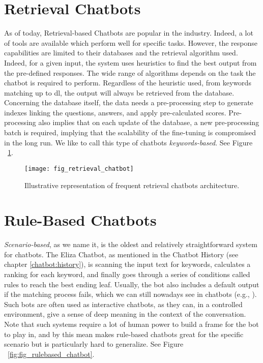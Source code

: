 
\section{Retrieval Chatbots}
\label{chatbot:retrieval}
As of today, Retrieval-based Chatbots are popular in the industry. Indeed, a lot of tools are available which perform well for specific tasks. However, the response capabilities are limited to their databases and the retrieval algorithm used. Indeed, for a given input, the system uses heuristics to find the best output from the pre-defined responses. The wide range of algorithms depends on the task the chatbot is required to perform. Regardless of the heuristic used, from keywords matching up to \gls{dl}, the output will always be retrieved from the database. Concerning the database itself, the data needs a pre-processing step to generate indexes linking the questions, answers, and apply pre-calculated scores. Pre-processing also implies that on each update of the database, a new pre-processing batch is required, implying that the scalability of the fine-tuning is compromised in the long run. We like to call this type of chatbots \textit{keywords-based}. See Figure ~\ref{fig:fig_retrieval_chatbot}.

\begin{figure}[H]
    \centering
    \texttt{[image: fig\_retrieval\_chatbot]}
    \caption{Illustrative representation of frequent retrieval chatbots architecture.}
    \label{fig:fig_retrieval_chatbot}
\end{figure}


\section{Rule-Based Chatbots}
\label{chatbot:rulebased}
\textit{Scenario-based}, as we name it, is the oldest and relatively straightforward system for chatbots. The Eliza\cite{website:eliza} Chatbot, as mentioned in the Chatbot History (see chapter \ref{chatbot:history}), is scanning the input text for keywords, calculates a ranking for each keyword, and finally goes through a series of conditions called rules to reach the best ending leaf. Usually, the bot also includes a default output if the matching process fails, which we can still nowadays see in chatbots (e.g., ). Such bots are often used as interactive chatbots, as they can, in a controlled environment, give a sense of deep meaning in the context of the conversation. Note that such systems require a lot of human power to build a frame for the bot to play in, and by this mean makes rule-based chatbots great for the specific scenario but is particularly hard to generalize. See Figure ~\ref{fig:fig_rulebased_chatbot}.

